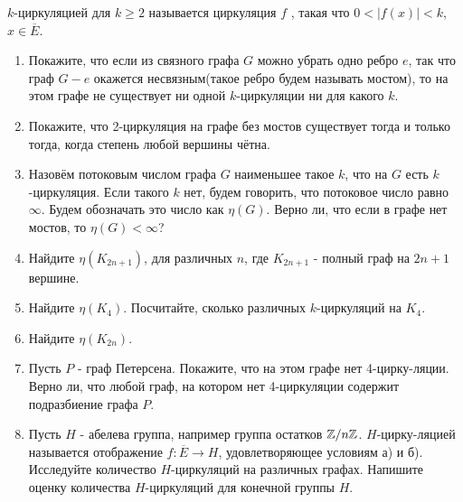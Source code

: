 $k$-циркуляцией для $k\geq 2$ называется циркуляция $f$ , такая что $0<|f(x)|<k$, $x\in \overline{E}$.

\begin{enumerate}
\item Покажите, что если из связного графа $G$ можно убрать одно ребро $e$, так что граф $G-e$ окажется несвязным(такое ребро будем называть мостом), то на этом графе не существует ни одной $k$-циркуляции ни для какого $k$.
\item Покажите, что 2-циркуляция на графе без мостов существует тогда и только тогда, когда степень любой вершины чётна.
\item Назовём потоковым числом графа $G$ наименьшее такое $k$, что на $G$ есть $k$-циркуляция. Если такого $k$ нет, будем говорить, что потоковое число равно $\infty$. Будем обозначать это число как $\eta(G)$. Верно ли, что если в графе нет мостов, то $\eta(G)<\infty$?
\item Найдите $\eta(K_{2n+1})$, для различных $n$, где $K_{2n+1}$ - полный граф на $2n+1$ вершине.
\item Найдите $\eta(K_{4})$. Посчитайте, сколько различных $k$-циркуляций на $K_4$.
\item Найдите $\eta(K_{2n})$.
\item Пусть $P$ - граф Петерсена. Покажите, что на этом графе нет 4-цирку-\linebreak ляции. Верно ли, что любой граф, на котором нет 4-циркуляции содержит подразбиение графа $P$.

\item Пусть $H$ - абелева группа, например группа остатков $\mathbb{Z}/n\mathbb{Z}$. $H$-цирку-\linebreak ляцией называется отображение $f\colon \overline{E} \to H$, удовлетворяющее условиям а) и б). Исследуйте количество $H$-циркуляций на различных графах. Напишите оценку количества $H$-циркуляций для конечной группы $H$.

\end{enumerate}



